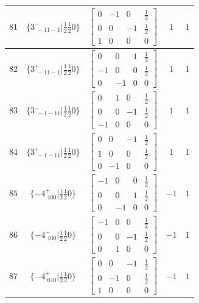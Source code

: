 \documentclass[fleqn,8pt]{jsarticle}
\begin{document}
\begin{longtable}{ccccc}
$ 81 $ & $ \{3^{-}_{\,\,-11-1}|\frac{1}{2} \frac{1}{2} 0\} $ & $ \begin{bmatrix} 0 & -1 & 0 & \frac{1}{2} \\ 0 & 0 & -1 & \frac{1}{2} \\ 1 & 0 & 0 & 0 \end{bmatrix} $ & $ 1 $ & $ 1 $ \\ \hline
$ 82 $ & $ \{3^{+}_{\,\,-11-1}|\frac{1}{2} \frac{1}{2} 0\} $ & $ \begin{bmatrix} 0 & 0 & 1 & \frac{1}{2} \\ -1 & 0 & 0 & \frac{1}{2} \\ 0 & -1 & 0 & 0 \end{bmatrix} $ & $ 1 $ & $ 1 $ \\ \hline
$ 83 $ & $ \{3^{-}_{\,\,-1-11}|\frac{1}{2} \frac{1}{2} 0\} $ & $ \begin{bmatrix} 0 & 1 & 0 & \frac{1}{2} \\ 0 & 0 & -1 & \frac{1}{2} \\ -1 & 0 & 0 & 0 \end{bmatrix} $ & $ 1 $ & $ 1 $ \\ \hline
$ 84 $ & $ \{3^{+}_{\,\,-1-11}|\frac{1}{2} \frac{1}{2} 0\} $ & $ \begin{bmatrix} 0 & 0 & -1 & \frac{1}{2} \\ 1 & 0 & 0 & \frac{1}{2} \\ 0 & -1 & 0 & 0 \end{bmatrix} $ & $ 1 $ & $ 1 $ \\ \hline
$ 85 $ & $ \{-4^{+}_{\,\,100}|\frac{1}{2} \frac{1}{2} 0\} $ & $ \begin{bmatrix} -1 & 0 & 0 & \frac{1}{2} \\ 0 & 0 & 1 & \frac{1}{2} \\ 0 & -1 & 0 & 0 \end{bmatrix} $ & $ -1 $ & $ 1 $ \\ \hline
$ 86 $ & $ \{-4^{-}_{\,\,100}|\frac{1}{2} \frac{1}{2} 0\} $ & $ \begin{bmatrix} -1 & 0 & 0 & \frac{1}{2} \\ 0 & 0 & -1 & \frac{1}{2} \\ 0 & 1 & 0 & 0 \end{bmatrix} $ & $ -1 $ & $ 1 $ \\ \hline
$ 87 $ & $ \{-4^{+}_{\,\,010}|\frac{1}{2} \frac{1}{2} 0\} $ & $ \begin{bmatrix} 0 & 0 & -1 & \frac{1}{2} \\ 0 & -1 & 0 & \frac{1}{2} \\ 1 & 0 & 0 & 0 \end{bmatrix} $ & $ -1 $ & $ 1 $ \\ \hline

\end{longtable}
\end{document}

